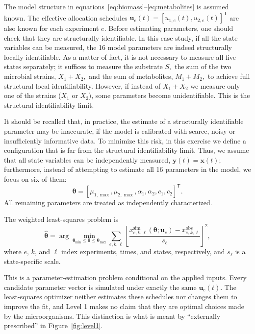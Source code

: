 \documentclass[11pt,a4paper]{article}
\newcommand{\vect}[1]{\boldsymbol{#1}}
\begin{document}
The model structure in equations~\eqref{eq:biomass}--\eqref{eq:metabolites} is assumed known. The effective allocation schedules \(\vect{u}_e(t)=[u_{1,e}(t),u_{2,e}(t)]^{\mathsf T}\) are also known for each experiment \(e\). 
Before estimating parameters, one should check that they are structurally identifiable. In this case study, if all the state variables can be measured, the 16 model parameters are indeed structurally locally identifiable. As a matter of fact, it is not necessary to measure all five states separately; it suffices to measure the substrate $S,$ the sum of the two microbial strains, $X_1+X_2,$ and the sum of metabolites, $M_1+M_2,$ to achieve full structural local identifiability. However, if instead of $X_1+X_2$ we measure only one of the strains ($X_1$ or $X_2$), some parameters become unidentifiable. This is the structural identifiability limit.

It should be recalled that, in practice, the estimate of a structurally identifiable parameter may be inaccurate, if the model is calibrated with scarce, noisy or insufficiently informative data. To minimize this risk, in this exercise we define a configuration that is far from the structural identifiability limit. Thus, we assume that all state variables can be independently measured, $\vect{y}(t)=\vect{x}(t);$ furthermore, instead of attempting to estimate all 16 parameters in the model, we focus on six of them:
\begin{equation}
  \vect{\theta} =
  [\mu_{1,\max},\mu_{2,\max},\alpha_1,\alpha_2,c_1,c_2]^{\mathsf T}.
\end{equation}
All remaining parameters are treated as independently characterized. 







The
weighted least-squares problem is
\begin{equation}
  \hat{\vect{\theta}} =
  \arg\min_{\vect{\theta}_{\min}\le\vect{\theta}\le\vect{\theta}_{\max}}
  \sum_{e,k,\ell}
  \left[
    \frac{x^{\mathrm{sim}}_{e,k,\ell}(\vect{\theta};\vect{u}_e)
          -x^{\mathrm{obs}}_{e,k,\ell}}
         {s_{\ell}}
  \right]^2,
\end{equation}
where \(e\), \(k\), and \(\ell\) index experiments, times, and states,
respectively, and \(s_{\ell}\) is a state-specific scale.

This is a parameter-estimation problem conditional on the applied inputs.
Every candidate parameter vector is simulated under exactly the same
\(\vect{u}_e(t)\). The least-squares optimizer neither estimates these
schedules nor changes them to improve the fit, and Level 1 makes no claim
that they are optimal choices made by the microorganisms. This distinction
is what is meant by ``externally prescribed'' in Figure~\ref{fig:level1}.
\end{document}
